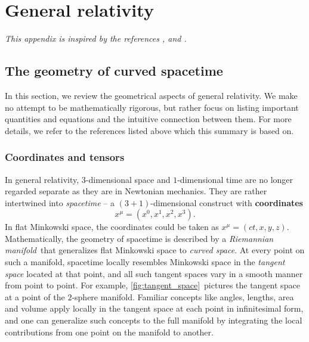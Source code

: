 \appendix

\chapter{General relativity}

\textit{This appendix is inspired by the references \cite{ref:carroll}, \cite{ref:mtw} and \cite{ref:mika_gr_notes}.}

\section{The geometry of curved spacetime}
\label{chap:gr_summary} %

\newcommand\pdvx[2]{\pdv{x^{#1}}{x^{#2}}}

In this section, we review the geometrical aspects of general relativity.
We make no attempt to be mathematically rigorous, but rather focus on listing important quantities and equations and the intuitive connection between them.
For more details, we refer to the references listed above which this summary is based on.

\subsection{Coordinates and tensors}

In general relativity, $3$-dimensional space and $1$-dimensional time are no longer regarded separate as they are in Newtonian mechanics.
They are rather intertwined into \emph{spacetime} -- a $(3+1)$-dimensional construct with \textbf{coordinates}
\begin{equation}
	x^\mu = (x^0, x^1, x^2, x^3) .
\end{equation}
In flat Minkowski space, the coordinates could be taken as $x^\mu = (ct, x, y, z)$.
Mathematically, the geometry of spacetime is described by a \emph{Riemannian manifold} that generalizes flat Minkowski space to \emph{curved space}.
At every point on such a manifold, spacetime locally resembles Minkowski space in the \emph{tangent space} located at that point, and all such tangent spaces vary in a smooth manner from point to point.
For example, \cref{fig:tangent_space} pictures the tangent space at a point of the $2$-sphere manifold.
Familiar concepts like angles, lengths, area and volume apply locally in the tangent space at each point in infinitesimal form, and one can generalize such concepts to the full manifold by integrating the local contributions from one point on the manifold to another.


